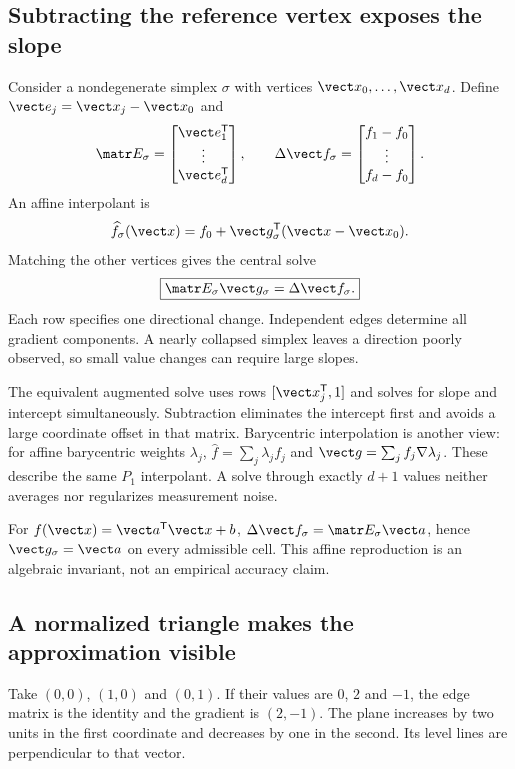\subsection{Subtracting the reference vertex exposes the slope}
Consider a nondegenerate simplex $\sigma$ with vertices
$\vect x_0,\ldots,\vect x_d$. Define
$\vect e_j=\vect x_j-\vect x_0$ and
\begin{equation}
 \matr E_\sigma=
 \begin{bmatrix}\vect e_1^{\mathsf T}\\\vdots\\\vect e_d^{\mathsf T}\end{bmatrix},
 \qquad
 \Delta\vect f_\sigma=
 \begin{bmatrix}f_1-f_0\\\vdots\\f_d-f_0\end{bmatrix}.
\end{equation}
An affine interpolant is
\begin{equation}
 \widehat f_\sigma(\vect x)=f_0+
 \vect g_\sigma^{\mathsf T}(\vect x-\vect x_0).
\end{equation}
Matching the other vertices gives the central solve
\begin{equation}
 \boxed{\matr E_\sigma\vect g_\sigma=\Delta\vect f_\sigma.}
 \label{eq:edgesolve}
\end{equation}
Each row specifies one directional change. Independent edges determine all
gradient components. A nearly collapsed simplex leaves a direction poorly
observed, so small value changes can require large slopes.

The equivalent augmented solve uses rows $[\vect x_j^{\mathsf T},1]$ and
solves for slope and intercept simultaneously. Subtraction eliminates the
intercept first and avoids a large coordinate offset in that matrix.
Barycentric interpolation is another view: for affine barycentric weights
$\lambda_j$, $\widehat f=\sum_j\lambda_j f_j$ and
$\vect g=\sum_j f_j\nabla\lambda_j$. These describe the same $P_1$
interpolant. A solve through exactly $d+1$ values neither averages nor
regularizes measurement noise.

For $f(\vect x)=\vect a^{\mathsf T}\vect x+b$,
$\Delta\vect f_\sigma=\matr E_\sigma\vect a$, hence
$\vect g_\sigma=\vect a$ on every admissible cell. This affine reproduction
is an algebraic invariant, not an empirical accuracy claim.

\subsection{A normalized triangle makes the approximation visible}
Take $(0,0)$, $(1,0)$ and $(0,1)$. If their values are $0$, $2$ and
$-1$, the edge matrix is the identity and the gradient is $(2,-1)$.
The plane increases by two units in the first coordinate and decreases by
one in the second. Its level lines are perpendicular to that vector.

